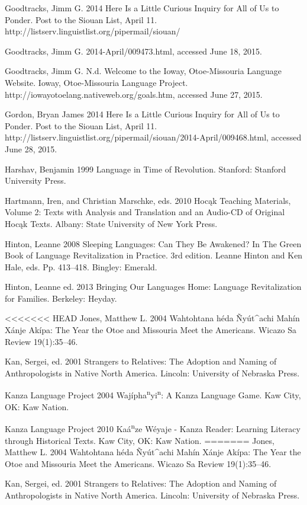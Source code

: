 \documentclass[output=paper]{LSP/langsci}
\begin{document}
\begin{reflist}
Goodtracks, Jimm G. 2014 Here Is a Little Curious Inquiry for All of Us to Ponder. Post to the Siouan List, April 11. http://listserv.linguistlist.org/pipermail/siouan/

Goodtracks, Jimm G. 2014-April/009473.html, accessed June 18, 2015.

Goodtracks, Jimm G. N.d. Welcome to the Ioway, Otoe-Missouria Language Website. Ioway, Otoe-Missouria Language Project. http://iowayotoelang.nativeweb.org/goals.htm, accessed June 27, 2015.

Gordon, Bryan James 2014 Here Is a Little Curious Inquiry for All of Us to Ponder. Post to the Siouan List, April 11. http://listserv.linguistlist.org/pipermail/siouan/2014-April/009468.html, accessed June 28, 2015.

Harshav, Benjamin 1999 Language in Time of Revolution. Stanford: Stanford University Press.

Hartmann, Iren, and Christian Marschke, eds. 2010 Hoc\k{a}k Teaching Materials, Volume 2: Texts with Analysis and Translation and an Audio-CD of Original Hoc\k{a}k Texts. Albany: State University of New York Press.

Hinton, Leanne 2008 Sleeping Languages: Can They Be Awakened? In The Green Book of Language Revitalization in Practice. 3rd edition. Leanne Hinton and Ken Hale, eds. Pp. 413--418. Bingley: Emerald.

Hinton, Leanne  ed. 2013 Bringing Our Languages Home: Language Revitalization for Families. Berkeley: Heyday.

<<<<<<< HEAD
Jones, Matthew L. 2004 Wahtohtana h\'eda \~Ny\'ut\^{ }achi Mahín Xánje Akípa: The Year the Otoe and Missouria Meet the Americans. Wicazo Sa Review 19(1):35--46.

Kan, Sergei, ed. 2001 Strangers to Relatives: The Adoption and Naming of Anthropologists in Native North America. Lincoln: University of Nebraska Press.

Kanza Language Project 2004 Wajípha\textsuperscript{n}yi\textsuperscript{n}: A Kanza Language Game. Kaw City, OK: Kaw Nation.

Kanza Language Project 2010 Kaá\textsuperscript{n}ze W\'eyaje - Kanza Reader: Learning Literacy through Historical Texts. Kaw City, OK: Kaw Nation.
=======
Jones, Matthew L. 2004 Wahtohtana h\'eda \~Ny\'ut\^{ }achi Mah\'in X\'anje Ak\'ipa: The Year the Otoe and Missouria Meet the Americans. Wicazo Sa Review 19(1):35--46.

Kan, Sergei, ed. 2001 Strangers to Relatives: The Adoption and Naming of Anthropologists in Native North America. Lincoln: University of Nebraska Press.


\end{reflist}
\end{document}
